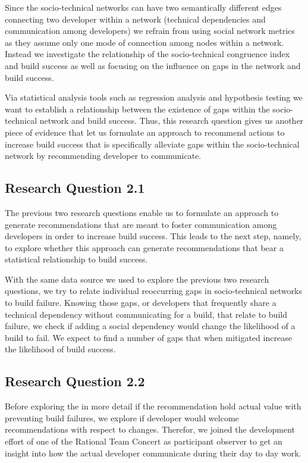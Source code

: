 Since the socio-technical networks can have two semantically different edges connecting two developer within a network (technical dependencies and communication among developers) we refrain from using social network metrics as they assume only one mode of connection among nodes within a network.
Instead we investigate the relationship of the socio-technical congruence index and build success as well as focusing on the influence on gaps in the network and build success.

Via statistical analysis tools such as regression analysis and hypothesis testing we want to establish a relationship between the existence of gaps within the socio-technical network and build success.
Thus, this research question gives us another piece of evidence that let us formulate an approach to recommend actions to increase build success that is specifically alleviate gaps within the socio-technical network by recommending developer to communicate.

\subsection{Research Question 2.1}
The previous two research questions enable us to formulate an approach to generate recommendations that are meant to foster communication among developers in order to increase build success.
This leads to the next step, namely, to explore whether this approach can generate recommendations that bear a statistical relationship to build success.

With the same data source we used to explore the previous two research questions, we try to relate individual reoccurring gaps in socio-technical networks to build failure.
Knowing those gaps, or developers that frequently share a technical dependency without communicating for a build, that relate to build failure, we check if adding a social dependency would change the likelihood of a build to fail.
We expect to find a number of gaps that when mitigated increase the likelihood of build success.

\subsection{Research Question 2.2}
Before exploring the in more detail if the recommendation hold actual value with preventing build failures, we explore if developer would welcome recommendations with respect to changes.
Therefor, we joined the development effort of one of the Rational Team Concert as participant observer to get an insight into how the actual developer communicate during their day to day work.

